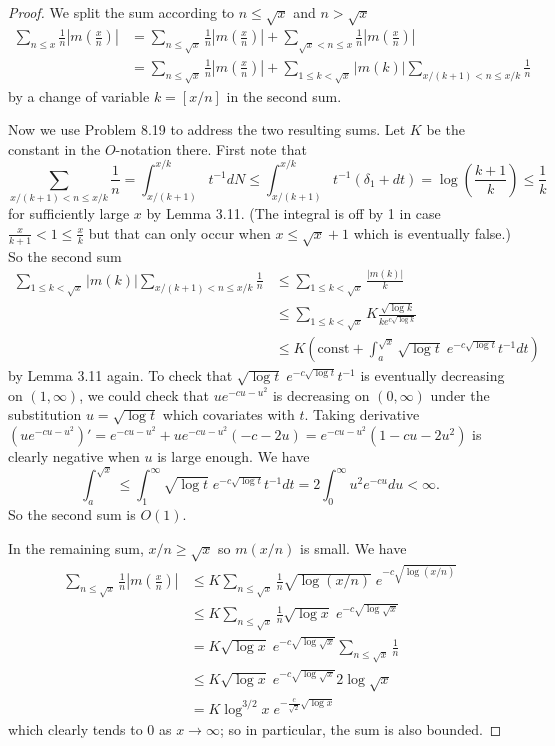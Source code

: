 \documentclass[12pt]{article}
\newcommand{\Abs}[1]{\left| #1 \right|}
\begin{document}
\begin{proof}
We split the sum according to $n \leq \sqrt{x}$ and $n > \sqrt{x}$
\begin{align*}
\sum_{n \leq x} \frac{1}{n} \Abs{m(\frac{x}{n})} &= \sum_{n \leq \sqrt{x}} \frac{1}{n} \Abs{m(\frac{x}{n})} + \sum_{\sqrt{x} < n \leq x} \frac{1}{n} \Abs{m(\frac{x}{n})} \\
&= \sum_{n \leq \sqrt{x}} \frac{1}{n} \Abs{m(\frac{x}{n})} + \sum_{1 \leq k < \sqrt{x}} |m(k)| \sum_{x/(k+1) < n \leq x/k} \frac{1}{n}
\end{align*}
by a change of variable $k = [x/n]$ in the second sum.

Now we use Problem 8.19 to address the two resulting sums. Let $K$ be the constant in the $O$-notation there. First note that
$$\sum_{x/(k+1) < n \leq x/k} \frac{1}{n} = \int_{x/(k+1)}^{x/k} t^{-1} dN \leq \int_{x/(k+1)}^{x/k} t^{-1} (\delta_1 + dt) = \log\left(\frac{k+1}{k}\right) \leq \frac{1}{k}$$
for sufficiently large $x$ by Lemma 3.11. (The integral is off by 1 in case $\frac{x}{k + 1} < 1 \leq \frac{x}{k}$ but that can only occur when $x \leq \sqrt{x} + 1$ which is eventually false.) So the second sum
\begin{align*}
\sum_{1 \leq k < \sqrt{x}} |m(k)| \sum_{x/(k+1) < n \leq x/k} \frac{1}{n} &\leq \sum_{1 \leq k < \sqrt{x}} \frac{|m(k)|}{k}\\
&\leq \sum_{1 \leq k < \sqrt{x}} K \frac{\sqrt{\log k}}{k e^{c\sqrt{\log k}}}\\
&\leq K (\text{const} + \int_a^{\sqrt x} \sqrt{\log t} \; e^{-c\sqrt{\log t}} t^{-1} dt)
\end{align*}
by Lemma 3.11 again. To check that $\sqrt{\log t} \; e^{-c\sqrt{\log t}} t^{-1}$ is eventually decreasing on $(1, \infty)$, we could check that $u e^{-cu-u^2}$ is decreasing on $(0, \infty)$ under the substitution $u = \sqrt{\log t}$ which covariates with $t$. Taking derivative $(u e^{-cu-u^2})' = e^{-cu-u^2} + u e^{-cu-u^2} (-c-2u) = e^{-cu-u^2}(1 - cu - 2u^2)$ is clearly negative when $u$ is large enough. We have
$$\int_a^{\sqrt x} \leq \int_1^{\infty} \sqrt{\log t} \; e^{-c\sqrt{\log t}} t^{-1} dt = 2 \int_0^\infty u^2 e^{-cu} du < \infty.$$
So the second sum is $O(1)$.

In the remaining sum, $x/n \geq \sqrt{x}$ so $m(x/n)$ is small. We have
\begin{align*}
\sum_{n \leq \sqrt{x}} \frac{1}{n} \Abs{m(\frac{x}{n})} &\leq K \sum_{n \leq \sqrt{x}} \frac{1}{n} \sqrt{\log(x/n)} \; e^{-c\sqrt{\log(x/n)}}\\
&\leq K \sum_{n \leq \sqrt{x}} \frac{1}{n} \sqrt{\log x} \; e^{-c\sqrt{\log \sqrt{x}}}\\
&= K \sqrt{\log x} \; e^{-c\sqrt{\log \sqrt{x}}} \sum_{n \leq \sqrt{x}} \frac{1}{n}\\
&\leq K \sqrt{\log x} \; e^{-c\sqrt{\log \sqrt{x}}} 2 \log \sqrt{x}\\
&= K \log^{3/2} x \; e^{-\frac{c}{\sqrt{2}} \sqrt{\log x}}
\end{align*}
which clearly tends to 0 as $x \rightarrow \infty$; so in particular, the sum is also bounded.
\end{proof}
\end{document}
